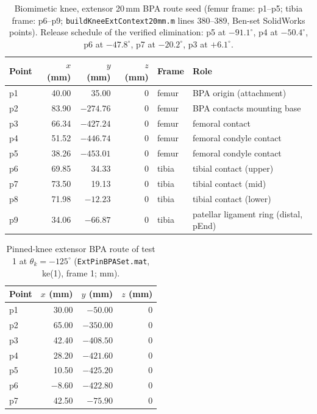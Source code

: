 \begin{table}
\caption{Biomimetic knee, extensor 20\,mm BPA route seed (femur frame: p1--p5; tibia frame: p6--p9; \texttt{buildKneeExtContext20mm.m} lines 380--389, Ben-set SolidWorks points). Release schedule of the verified elimination: p5 at $-91.1^{\circ}$, p4 at $-50.4^{\circ}$, p6 at $-47.8^{\circ}$, p7 at $-20.2^{\circ}$, p3 at $+6.1^{\circ}$.}
\label{tab:app_ext_seed}
\begin{tabular}{@{}lrrrll@{}}
\toprule
\textbf{Point} & $x$ (mm) & $y$ (mm) & $z$ (mm) & \textbf{Frame} & \textbf{Role} \\
\midrule
p1 & 40.00 & 35.00  & 0 & femur & BPA origin (attachment) \\
p2 & 83.90 & $-274.76$ & 0 & femur & BPA contacts mounting base \\
p3 & 66.34 & $-427.24$ & 0 & femur & femoral contact \\
p4 & 51.52 & $-446.74$ & 0 & femur & femoral condyle contact \\
p5 & 38.26 & $-453.01$ & 0 & femur & femoral condyle contact \\
p6 & 69.85 & 34.33  & 0 & tibia & tibial contact (upper) \\
p7 & 73.50 & 19.13  & 0 & tibia & tibial contact (mid) \\
p8 & 71.98 & $-12.23$ & 0 & tibia & tibial contact (lower) \\
p9 & 34.06 & $-66.87$ & 0 & tibia & patellar ligament ring (distal, pEnd) \\
\bottomrule
\end{tabular}
\end{table}

\begin{table}[htbp]
\caption{Pinned-knee extensor BPA route of test 1 at $\theta_{k}=-125^{\circ}$ (\texttt{ExtPinBPASet.mat}, ke(1), frame 1; mm).}
\label{tab:app_extpin_route}
\begin{tabular}{@{}lrrr@{}}
\toprule
\textbf{Point} & $x$ (mm) & $y$ (mm) & $z$ (mm) \\
\midrule
p1 & 30.00  & $-50.00$ & 0 \\
p2 & 65.00  & $-350.00$ & 0 \\
p3 & 42.40  & $-408.50$ & 0 \\
p4 & 28.20  & $-421.60$ & 0 \\
p5 & 10.50  & $-425.20$ & 0 \\
p6 & $-8.60$ & $-422.80$ & 0 \\
p7 & 42.50  & $-75.90$ & 0 \\
\bottomrule
\end{tabular}
\end{table}

